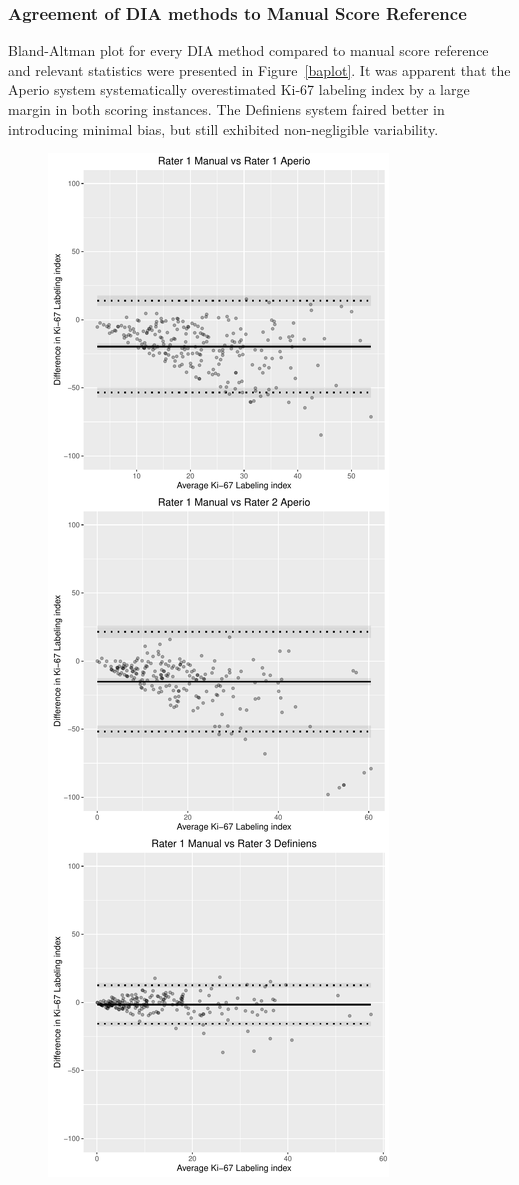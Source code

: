 \documentclass[final,5p,times,twocolumn]{elsarticle}
\begin{document}
\subsubsection*{Agreement of DIA methods to Manual Score Reference}

Bland-Altman plot for every DIA method compared to manual score reference and relevant statistics were presented in Figure~\ref{baplot}. It was apparent that the Aperio system systematically overestimated Ki-67 labeling index by a large margin in both scoring instances. The Definiens system faired better in introducing minimal bias, but still exhibited non-negligible variability.


\begin{figure}
\includegraphics[width = 0.8\linewidth]{baplot}

\end{figure}
\end{document}
